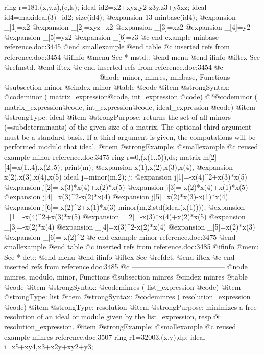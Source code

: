 {  ring r=181,(x,y,z),(c,ls);
  ideal id2=x2+xyz,y2-z3y,z3+y5xz;
  ideal id4=maxideal(3)+id2;
  size(id4);
@expansion{} 13
  minbase(id4);
@expansion{} _[1]=x2
@expansion{} _[2]=xyz+x2
@expansion{} _[3]=xz2
@expansion{} _[4]=y2
@expansion{} _[5]=yz2
@expansion{} _[6]=z3
@c end example minbase reference.doc:3445
@end smallexample
@end table
@c inserted refs from reference.doc:3454
@ifinfo
@menu
See
* mstd::
@end menu
@end ifinfo
@iftex
See
@ref{mstd}.
@end iftex
@c end inserted refs from reference.doc:3454
@c ---------------------------------------
@node minor, minres, minbase, Functions
@subsection minor
@cindex minor
@table @code
@item @strong{Syntax:}
@code{minor (} matrix_expression@code{,} int_expression @code{)}
@*@code{minor (} matrix_expression@code{,} int_expression@code{,} ideal_expression @code{)}
@item @strong{Type:}
ideal
@item @strong{Purpose:}
returns the set of all minors (=subdeterminants) of the given size of a matrix.
The optional third argument must be a standard basis.
If a third argument is given, the computations will be performed modulo that
ideal.
@item @strong{Example:}
@smallexample
@c reused example minor reference.doc:3475 
  ring r=0,(x(1..5)),ds;
  matrix m[2][4]=x(1..4),x(2..5);
  print(m);
@expansion{} x(1),x(2),x(3),x(4),
@expansion{} x(2),x(3),x(4),x(5) 
  ideal j=minor(m,2);
  j;
@expansion{} j[1]=-x(4)^2+x(3)*x(5)
@expansion{} j[2]=-x(3)*x(4)+x(2)*x(5)
@expansion{} j[3]=-x(2)*x(4)+x(1)*x(5)
@expansion{} j[4]=x(3)^2-x(2)*x(4)
@expansion{} j[5]=x(2)*x(3)-x(1)*x(4)
@expansion{} j[6]=-x(2)^2+x(1)*x(3)
  minor(m,2,std(ideal(x(1))));
@expansion{} _[1]=-x(4)^2+x(3)*x(5)
@expansion{} _[2]=-x(3)*x(4)+x(2)*x(5)
@expansion{} _[3]=-x(2)*x(4)
@expansion{} _[4]=x(3)^2-x(2)*x(4)
@expansion{} _[5]=x(2)*x(3)
@expansion{} _[6]=-x(2)^2
@c end example minor reference.doc:3475
@end smallexample
@end table
@c inserted refs from reference.doc:3485
@ifinfo
@menu
See
* det::
@end menu
@end ifinfo
@iftex
See
@ref{det}.
@end iftex
@c end inserted refs from reference.doc:3485
@c ---------------------------------------
@node  minres, modulo, minor, Functions
@subsection minres
@cindex minres
@table @code
@item @strong{Syntax:}
@code{minres (} list_expression @code{)}
@item @strong{Type:}
list
@item @strong{Syntax:}
@code{minres (} resolution_expression @code{)}
@item @strong{Type:}
resolution
@item @strong{Purpose:}
minimizes a free resolution of an ideal or module
given by the list_expression, resp.@: resolution_expression.
@item @strong{Example:}
@smallexample
@c reused example minres reference.doc:3507 
  ring r1=32003,(x,y),dp;
  ideal i=x5+xy4,x3+x2y+xy2+y3;
}

